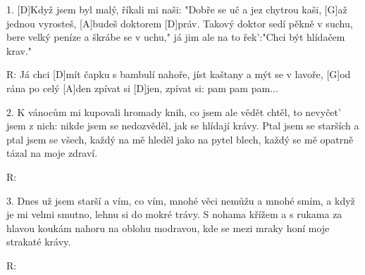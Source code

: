 
1. [D]Když jsem byl malý, říkali mi naši:
"Dobře se uč a jez chytrou kaši,
[G]až jednou vyrosteš, [A]budeš doktorem [D]práv.
Takový doktor sedí pěkně v suchu,
bere velký peníze a škrábe se v uchu,"
já jim ale na to řek':"Chci být hlídačem krav."

R: Já chci [D]mít čapku s bambulí nahoře,
jíst kaštany a mýt se v lavoře,
[G]od rána po celý [A]den zpívat si [D]jen,
zpívat si: pam pam pam...

2. K vánocům mi kupovali hromady knih,
co jsem ale vědět chtěl, to nevyčet' jsem z nich:
nikde jsem se nedozvěděl, jak se hlídají krávy.
Ptal jsem se starších a ptal jsem se všech,
každý na mě hleděl jako na pytel blech,
každý se mě opatrně tázal na moje zdraví.

R:

3. Dnes už jsem starší a vím, co vím,
mnohé věci nemůžu a mnohé smím,
a když je mi velmi smutno, lehnu si do mokré trávy.
S nohama křížem a s rukama za hlavou
koukám nahoru na oblohu modravou,
kde se mezi mraky honí moje strakaté krávy.

R: